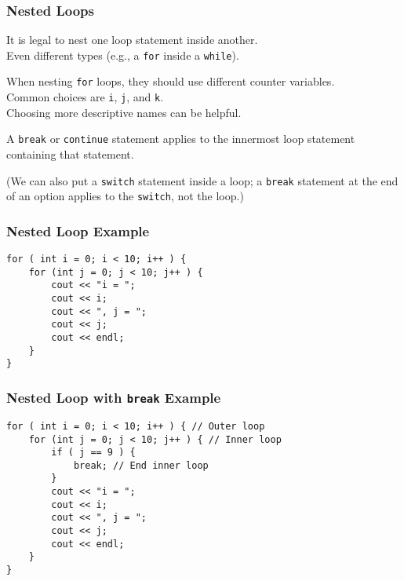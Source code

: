 \begin{frame}
\frametitle{Nested Loops}

It is legal to nest one loop statement inside another.\\
\quad Even different types (e.g., a \texttt{for} inside a \texttt{while}).

When nesting \texttt{for} loops, they should use different counter variables.\\
\quad Common choices are \texttt{i}, \texttt{j}, and \texttt{k}.\\
\quad Choosing more descriptive names can be helpful.

A \texttt{break} or \texttt{continue} statement applies to the innermost loop statement containing that statement.

(We can also put a \texttt{switch} statement inside a loop; a \texttt{break} statement at the end of an option applies to the \texttt{switch}, not the loop.)

\end{frame}

\begin{frame}[fragile]
\frametitle{Nested Loop Example}

\begin{verbatim}
for ( int i = 0; i < 10; i++ ) {
    for (int j = 0; j < 10; j++ ) {
        cout << "i = ";
        cout << i;
        cout << ", j = ";
        cout << j;
        cout << endl;
    }
}
\end{verbatim}

\end{frame}

\begin{frame}[fragile]
\frametitle{Nested Loop with \texttt{break} Example}

\begin{verbatim}
for ( int i = 0; i < 10; i++ ) { // Outer loop
    for (int j = 0; j < 10; j++ ) { // Inner loop
        if ( j == 9 ) {
            break; // End inner loop
        }
        cout << "i = ";
        cout << i;
        cout << ", j = ";
        cout << j;
        cout << endl;
    }
}
\end{verbatim}

\end{frame}


